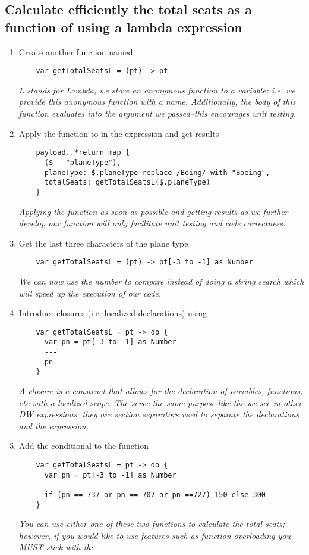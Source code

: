 \subsection{Calculate efficiently the total seats as a function of  using a lambda expression}
\begin{enumerate}[resume*]
\item Create another function named 
  \begin{verbatim}
    var getTotalSeatsL = (pt) -> pt
  \end{verbatim}
  \emph{
    L stands for Lambda, we store an anonymous function to a variable; i.e. we provide this anonymous function
    with a name.  Additionally, the body of this function evaluates into the argument we passed--this encourages
    unit testing.
  }
\item Apply the function to in the expression and get results
  \begin{verbatim}
    payload..*return map {
      ($ - "planeType"),
      planeType: $.planeType replace /Boing/ with "Boeing",
      totalSeats: getTotalSeatsL($.planeType)
    }
  \end{verbatim}
  \emph{
    Applying the function as soon as possible and getting results as we further develop our function
    will only facilitate unit testing and code correctness.
  }
\item Get the last three characters of the plane type
  \begin{verbatim}
    var getTotalSeatsL = (pt) -> pt[-3 to -1] as Number
  \end{verbatim}
  \emph{
    We can now use the number to compare instead of doing a string search which will speed up the execution of
    our code.
  }
\item Introduce closures (i.e. localized declarations) using 
  \begin{verbatim}
    var getTotalSeatsL = pt -> do {
      var pn = pt[-3 to -1] as Number
      ---
      pn
    }
  \end{verbatim}
  \emph{
    A \href{https://en.wikipedia.org/wiki/Closure_(computer_programming)}{closure} is a construct that allows for
    the declaration of variables, functions, etc with a localized scope.  The \ttt{---} serve the same purpose
    like the \ttt{---} we see in other DW expressions, they are section separators used to separate the
    declarations and the expression.
  }
\item Add the conditional to the function
  \begin{verbatim}
    var getTotalSeatsL = pt -> do {
      var pn = pt[-3 to -1] as Number
      ---
      if (pn == 737 or pn == 707 or pn ==727) 150 else 300
    }    
  \end{verbatim}
  \emph{
    You can use either one of these two functions to calculate the total seats; however, if you would like to use
    features such as function overloading you MUST stick with the .
  }
\end{enumerate}

